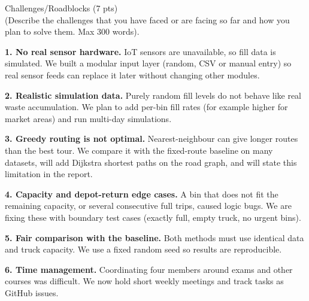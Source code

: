 \documentclass[10pt,a4paper]{article}
\newcommand{\sectionhead}[2]{%
  \needspace{8\baselineskip}
  \vspace{6pt}
  {\Large\color{headblue}#1}\\[-2pt]
  {\small\color{hintgrey}#2}\par\vspace{2pt}}
\begin{document}
\sectionhead{Challenges/Roadblocks (7 pts)}{(Describe the challenges that you have faced or are facing so far and how you plan to solve them. Max 300 words).}
\begin{answerbox}
\textbf{1. No real sensor hardware.} IoT sensors are unavailable, so fill data is simulated. We built a modular input layer (random, CSV or manual entry) so real sensor feeds can replace it later without changing other modules.

\textbf{2. Realistic simulation data.} Purely random fill levels do not behave like real waste accumulation. We plan to add per-bin fill rates (for example higher for market areas) and run multi-day simulations.

\textbf{3. Greedy routing is not optimal.} Nearest-neighbour can give longer routes than the best tour. We compare it with the fixed-route baseline on many datasets, will add Dijkstra shortest paths on the road graph, and will state this limitation in the report.

\textbf{4. Capacity and depot-return edge cases.} A bin that does not fit the remaining capacity, or several consecutive full trips, caused logic bugs. We are fixing these with boundary test cases (exactly full, empty truck, no urgent bins).

\textbf{5. Fair comparison with the baseline.} Both methods must use identical data and truck capacity. We use a fixed random seed so results are reproducible.

\textbf{6. Time management.} Coordinating four members around exams and other courses was difficult. We now hold short weekly meetings and track tasks as GitHub issues.
\end{answerbox}
\end{document}
